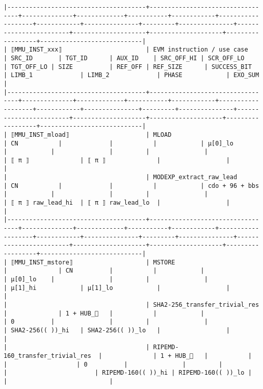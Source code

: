 \documentclass[varwidth=\maxdimen,margin=0.5cm,multi={verbatim}]{standalone}
\begin{document}
\begin{verbatim}
|--------------------------------------+----------------------------------+--------------+-------------+-----------+------------+-------------------+------------+---------------+---------+---------------+------------------------+--------------------+--------------------+------------------+----------------------------|
| ⟦MMU_INST_xxx⟧                       | EVM instruction / use case       | SRC_ID       | TGT_ID      | AUX_ID    | SRC_OFF_HI | SCR_OFF_LO        | TGT_OFF_LO | SIZE          | REF_OFF | REF_SIZE      | SUCCESS_BIT            | LIMB_1             | LIMB_2             | PHASE            | EXO_SUM                    |
|--------------------------------------+----------------------------------+--------------+-------------+-----------+------------+-------------------+------------+---------------+---------+---------------+------------------------+--------------------+--------------------+------------------+----------------------------|
| ⟦MMU_INST_mload⟧                     | MLOAD                            | CN           |             |           |            | µ[0]_lo           |            |               |         |               |                        | ⟦ π ⟧              | ⟦ π ⟧              |                  |                            |
|                                      | MODEXP_extract_raw_lead          | CN           |             |           |            | cdo + 96 + bbs    |            |               |         |               |                        | ⟦ π ⟧ raw_lead_hi  | ⟦ π ⟧ raw_lead_lo  |                  |                            |
|--------------------------------------+----------------------------------+--------------+-------------+-----------+------------+-------------------+------------+---------------+---------+---------------+------------------------+--------------------+--------------------+------------------+----------------------------|
| ⟦MMU_INST_mstore⟧                    | MSTORE                           |              | CN          |           |            |                   | µ[0]_lo    |               |         |               |                        | µ[1]_hi            | µ[1]_lo            |                  |                            |
|                                      | SHA2-256_transfer_trivial_res    |              | 1 + HUB_   |           |            |                   | 0          |               |         |               |                        | SHA2-256(( ))_hi   | SHA2-256(( ))_lo   |                  |                            |
|                                      | RIPEMD-160_transfer_trivial_res  |              | 1 + HUB_   |           |            |                   | 0          |               |         |               |                        | RIPEMD-160(( ))_hi | RIPEMD-160(( ))_lo |                  |                            |

\end{verbatim}
\end{document}
